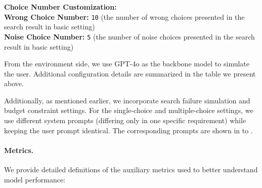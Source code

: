 {\begin{tcolorbox}[colback=gray!5!white, colframe=black!75!black, 
title=Environment Configuration, boxrule=0.3mm, width=0.48\textwidth, arc=3mm, auto outer arc=true]
\textbf{Choice Number Customization:} \\
\hspace*{4mm}\textbf{Wrong Choice Number:} \texttt{10} (the number of wrong choices presented in the search result in basic setting) \\
\hspace*{4mm}\textbf{Noise Choice Number:} \texttt{5} (the number of noise choices presented in the search result in basic setting) \\
\end{tcolorbox}
}

From the environment side, we use GPT-4o as the backbone model to simulate the user. Additional configuration details are summarized in the table we present above.

Additionally, as mentioned earlier, we incorporate search failure simulation and budget constraint settings. For the single-choice and multiple-choice settings, we use different system prompts (differing only in one specific requirement) while keeping the user prompt identical. The corresponding prompts are shown in  to .


\paragraph{Metrics.}
We provide detailed definitions of the auxiliary metrics used to better understand model performance:

